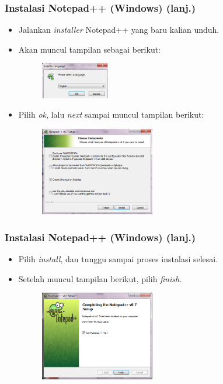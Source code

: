 \begin{frame}
\frametitle{Instalasi Notepad++ (Windows) (lanj.)}
\begin{itemize}
  \item Jalankan \textit{installer} Notepad++ yang baru kalian unduh.
  \item Akan muncul tampilan sebagai berikut:
  \begin{figure}
    \includegraphics[width=3cm]{asset/npp_3.PNG}
  \end{figure}
  \item Pilih \textit{ok}, lalu \textit{next} sampai muncul tampilan berikut:
  \begin{figure}
    \includegraphics[width=5cm]{asset/npp_7.PNG}
  \end{figure}
\end{itemize}
\end{frame}

\begin{frame}
\frametitle{Instalasi Notepad++ (Windows) (lanj.)}
\begin{itemize}
  \item Pilih \textit{install}, dan tunggu sampai proses instalasi selesai.
  \item Setelah muncul tampilan berikut, pilih \textit{finish}.
  \begin{figure}
    \includegraphics[width=5cm]{asset/npp_9.PNG}
  \end{figure}
\end{itemize}
\end{frame}

